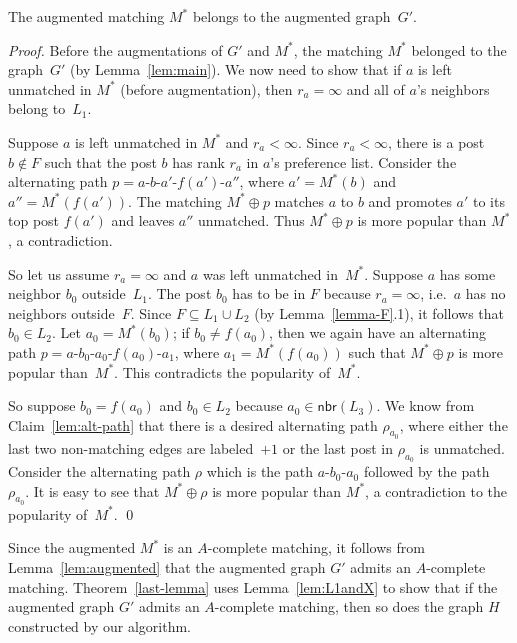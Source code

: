 \documentclass[11pt]{llncs}
\newcommand{\Nbr}{\mathsf{nbr}}
\begin{document}
\begin{lemma}
\label{lem:augmented}
The augmented matching $M^*$ belongs to the augmented graph~$G'$.
\end{lemma}
\begin{proof}
Before the augmentations of $G'$ and $M^*$, the matching $M^*$ belonged to the graph~$G'$ (by Lemma~\ref{lem:main}). We now need to 
show that if $a$ is left unmatched in $M^*$ (before augmentation), then $r_a = \infty$ and all of $a$'s neighbors belong to~$L_1$.

Suppose $a$ is left unmatched in $M^*$ and $r_a < \infty$. 
Since $r_a < \infty$, there is a post $b \notin F$ such that the post $b$ has rank $r_a$ in 
$a$'s preference list. Consider the alternating path $p = a$-$b$-$a'$-$f(a')$-$a''$, where 
$a' = M^*(b)$ and $a'' = M^*(f(a'))$. The matching $M^* \oplus p$ matches $a$ to $b$ and promotes
$a'$ to its top post $f(a')$ and leaves $a''$ unmatched.
Thus $M^* \oplus p$ is more popular than $M^*$, a contradiction.

So let us assume $r_a = \infty$ and $a$ was left unmatched in~$M^*$. Suppose $a$ has some neighbor $b_0$ outside~$L_1$. 
The post $b_0$ has to be in $F$ because $r_a = \infty$, i.e.\ $a$ has no neighbors outside~$F$. 
Since $F \subseteq L_1 \cup L_2$ (by Lemma~\ref{lemma-F}.1), it follows that $b_0 \in L_2$. Let $a_0 = M^*(b_0)$; if 
$b_0 \ne f(a_0)$, then we again have an alternating path $p = a$-$b_0$-$a_0$-$f(a_0)$-$a_1$, 
where $a_1 = M^*(f(a_0))$ such that $M^* \oplus p$ is more popular than~$M^*$.
This contradicts the popularity of~$M^*$.

So suppose  $b_0 = f(a_0)$ and $b_0 \in L_2$ because $a_0 \in \Nbr(L_3)$. We know from 
Claim~\ref{lem:alt-path} that there is a desired alternating path $\rho_{a_0}$, where
either the last two non-matching edges are labeled~$+1$ or the last post in $\rho_{a_0}$ 
is unmatched. 
Consider the alternating path $\rho$ which is the path $a$-$b_0$-$a_0$ followed by the path~$\rho_{a_0}$. 
It is easy to see that $M^* \oplus \rho$ is more popular than $M^*$, 
a contradiction to the popularity of~$M^*$. \qed
\end{proof}

Since the augmented $M^*$ is an $A$-complete matching, it follows from Lemma~\ref{lem:augmented} 
that the augmented graph $G'$ admits an $A$-complete matching. 
Theorem~\ref{last-lemma} uses Lemma~\ref{lem:L1andX} to show that if the augmented graph $G'$ 
admits an $A$-complete matching, then so does the graph $H$ constructed by our algorithm. 
\end{document}
